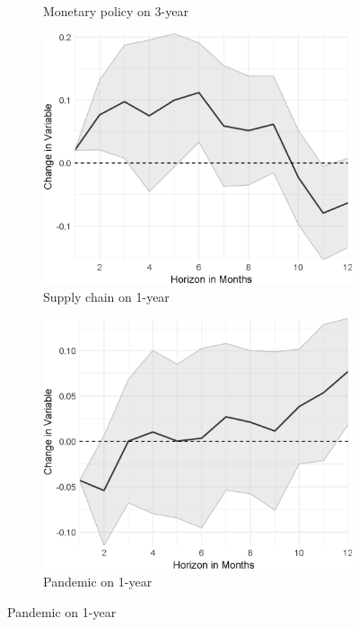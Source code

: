 \begin{figure}[H]
\begin{subfigure}{00.32\textwidth}
		\caption{Monetary policy on 3-year}
	\end{subfigure}
	\begin{subfigure}{00.32\textwidth}
		\includegraphics[width=1\textwidth]{output/lp/baseline/bHP/supply_chain/supply_chainonexpectations1y_djn.eps}
		\caption{Supply chain on 1-year}
	\end{subfigure}
	\begin{subfigure}{00.32\textwidth}
		\includegraphics[width=1\textwidth]{output/lp/baseline/bHP/pandemic/pandemiconexpectations1y_djn.eps}
		\caption{Pandemic on 1-year}
	\end{subfigure}

\end{figure}

